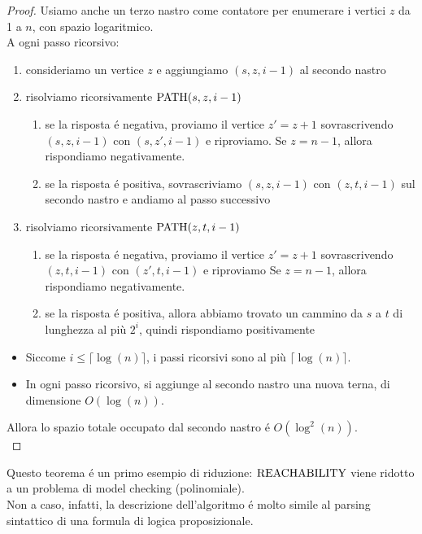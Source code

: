\begin{proof}
Usiamo anche un terzo nastro come contatore per enumerare i vertici $z$ da 1 a $n$, con spazio logaritmico. \\

A ogni passo ricorsivo:
\begin{enumerate}
    \item consideriamo un vertice $z$ e aggiungiamo $(s, z, i-1)$ al secondo nastro
    \item risolviamo ricorsivamente $\text{PATH}(s, z, i-1)$
    \begin{enumerate}
    \item se la risposta é negativa, proviamo il vertice $z' = z+1$ sovrascrivendo $(s, z, i-1)$ con $(s, z', i-1)$ e riproviamo. 
    \subitem Se $z = n-1$, allora rispondiamo negativamente.
    \item se la risposta é positiva, sovrascriviamo $(s, z, i-1)$ con $(z, t, i-1)$ sul secondo nastro e andiamo al passo successivo
    \end{enumerate}
    \item risolviamo ricorsivamente $\text{PATH}(z, t, i-1)$
    \begin{enumerate}
    \item se la risposta é negativa, proviamo il vertice $z'= z+1$ sovrascrivendo $(z, t, i-1)$ con $(z', t, i-1)$ e riproviamo
    \subitem Se $z = n-1$, allora rispondiamo negativamente.
    \item se la risposta é positiva, allora abbiamo trovato un cammino da $s$ a $t$ di lunghezza al più $2^i$, quindi rispondiamo positivamente \\
    \end{enumerate}
\end{enumerate}

\begin{itemize}
    \item Siccome $i \leq \lceil \log(n) \rceil$, i passi ricorsivi sono al più $\lceil \log(n) \rceil$. 
    \item In ogni passo ricorsivo, si aggiunge al secondo nastro una nuova terna, di dimensione $O(\log(n))$. 
\end{itemize}
Allora lo spazio totale occupato dal secondo nastro é $O(\log^2(n))$. \\
\end{proof}

Questo teorema é un primo esempio di riduzione: $\text{REACHABILITY}$ viene ridotto a un problema di model checking (polinomiale). \\
Non a caso, infatti, la descrizione dell'algoritmo é molto simile al parsing sintattico di una formula di logica proposizionale.